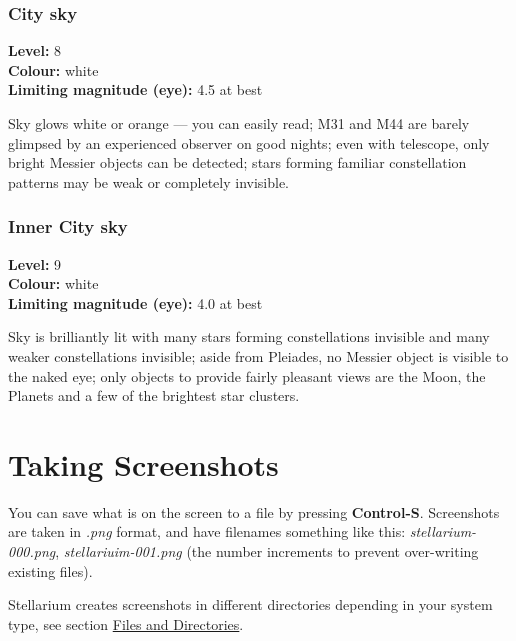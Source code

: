 \subsection{City sky}
\textbf{Level:} 8 \\
\textbf{Colour:} white \\
\textbf{Limiting magnitude (eye):} 4.5 at best

Sky glows white or orange --- you can easily read; M31 and M44 are barely glimpsed by an experienced observer on good nights; even with telescope, only bright Messier objects can be detected; stars forming familiar constellation patterns may be weak or completely invisible.

\subsection{Inner City sky}
\textbf{Level:} 9 \\
\textbf{Colour:} white \\
\textbf{Limiting magnitude (eye):} 4.0 at best

Sky is brilliantly lit with many stars forming constellations invisible and many weaker
constellations invisible; aside from Pleiades, no Messier object is visible to the naked eye; only objects to provide fairly pleasant views are the Moon, the Planets and a few of the brightest star clusters.

\chapter{Taking Screenshots}\label{taking-screenshots}

You can save what is on the screen to a file by pressing
\textbf{Control-S}. Screenshots are taken in \emph{.png} format, and
have filenames something like this: \emph{stellarium-000.png},
\emph{stellariuim-001.png} (the number increments to prevent
over-writing existing files).

Stellarium creates screenshots in different directories depending in
your system type, see section
\href{Advanced_Use\#Files_and_Directories}{Files and Directories}.




